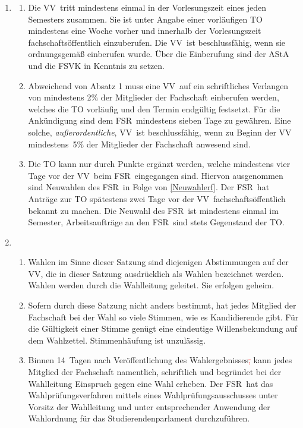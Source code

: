 \documentclass[a4paper, 12pt]{article}
\newcommand{\streichen}[1]{\textcolor{red}{\sout{#1}}}
\newcommand{\neu}[1]{\textcolor{OliveGreen}{#1}}
\newcommand{\vv}{VV}
\newcommand{\rat}{FSR}
\newcommand{\rates}{FSR}
\begin{document}
\begin{enumerate}[leftmargin=0cm]

	\item {}\label{EinberufungVV}
	\begin{enumerate}[leftmargin=0cm]
		\item Die \vv~tritt mindestens einmal in der Vorlesungszeit eines jeden Semesters zusammen. Sie ist unter Angabe einer vorläufigen TO mindestens eine Woche vorher und innerhalb der Vorlesungszeit fachschaftsöffentlich einzuberufen. Die \vv~ist beschlussfähig, wenn sie ordnungsgemäß einberufen wurde. Über die Einberufung sind der AStA und die FSVK in Kenntnis zu setzen.
		\item Abweichend von Absatz 1 muss eine \vv~auf ein schriftliches Verlangen von mindestens 2\% der Mitglieder der Fachschaft einberufen werden, welches die TO vorläufig und den Termin endgültig festsetzt. Für die Ankündigung sind dem \rat~mindestens sieben Tage zu gewähren. Eine solche, \textit{außerordentliche}, \vv~ist beschlussfähig, wenn zu Beginn der \vv~
		mindestens~5\% der Mitglieder der Fachschaft anwesend sind.
		\item Die TO kann nur durch Punkte ergänzt werden, welche mindestens vier Tage vor der \vv~beim \rat~eingegangen sind. Hiervon ausgenommen sind Neuwahlen des \rates~in Folge von \cref{Neuwahlerf}. Der \rat~hat Anträge zur TO spätestens zwei Tage vor der \vv~fachschaftsöffentlich bekannt zu machen. Die Neuwahl des \rates~ist mindestens einmal im Semester, Arbeitsaufträge an den \rat~sind stets Gegenstand der TO.
	\end{enumerate}

	\newpage

	\item {}
	\begin{enumerate}[leftmargin=0cm]
		\item Wahlen im Sinne dieser Satzung sind diejenigen Abstimmungen auf der \vv, die in dieser Satzung ausdrücklich als Wahlen bezeichnet werden. Wahlen werden durch die Wahlleitung geleitet. Sie erfolgen geheim.
	 	\item Sofern durch diese Satzung nicht anders bestimmt, hat jedes Mitglied der Fachschaft bei der Wahl so viele Stimmen, wie es Kandidierende gibt. Für die Gültigkeit einer Stimme genügt eine eindeutige Willensbekundung auf dem Wahlzettel. Stimmenhäufung ist unzulässig.\label{StimmenbegrenzungFSR}
	 	\item Binnen 14~Tagen nach Veröffentlichung des Wahlergebnisses\streichen{,} kann jedes Mitglied der Fachschaft namentlich, schriftlich und begründet bei der Wahlleitung Einspruch gegen eine Wahl erheben. Der \rat~hat das Wahlprüfungsverfahren mittels eines Wahlprüfungsaus\neu{s}chusses unter Vorsitz der Wahlleitung und unter entsprechender Anwendung der Wahlordnung für das Studierendenparlament durchzuführen.
	\end{enumerate}


\end{enumerate}
\end{document}
